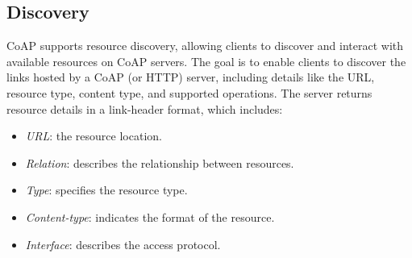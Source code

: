 \subsection{Discovery}
CoAP supports resource discovery, allowing clients to discover and interact with available resources on CoAP servers.
The goal is to enable clients to discover the links hosted by a CoAP (or HTTP) server, including details like the URL, resource type, content type, and supported operations.
The server returns resource details in a link-header format, which includes:
\begin{itemize}
    \item \textit{URL}: the resource location.
    \item \textit{Relation}: describes the relationship between resources.
    \item \textit{Type}: specifies the resource type.
    \item \textit{Content-type}: indicates the format of the resource.
    \item \textit{Interface}: describes the access protocol.
\end{itemize}